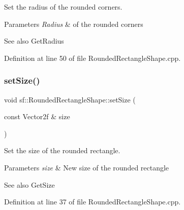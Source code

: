 Set the radius of the rounded corners. 


\begin{DoxyParams}{Parameters}
{\em Radius} & of the rounded corners\\
\hline
\end{DoxyParams}
\begin{DoxySeeAlso}{See also}
Get\+Radius \begin{DoxyVerb}\end{DoxyVerb}
 
\end{DoxySeeAlso}


Definition at line 50 of file Rounded\+Rectangle\+Shape.\+cpp.


\begin{DoxyCode}{0}

\end{DoxyCode}
\mbox{\label{classsf_1_1_rounded_rectangle_shape_a6c768c97f3b1412f8b310c3c64b7cc91}} 
\subsubsection{\texorpdfstring{setSize()}{setSize()}}
{\footnotesize\ttfamily void sf\+::\+Rounded\+Rectangle\+Shape\+::set\+Size (\begin{DoxyParamCaption}\item[{const Vector2f \&}]{size }\end{DoxyParamCaption})}



Set the size of the rounded rectangle. 


\begin{DoxyParams}{Parameters}
{\em size} & New size of the rounded rectangle\\
\hline
\end{DoxyParams}
\begin{DoxySeeAlso}{See also}
Get\+Size \begin{DoxyVerb}\end{DoxyVerb}
 
\end{DoxySeeAlso}


Definition at line 37 of file Rounded\+Rectangle\+Shape.\+cpp.


